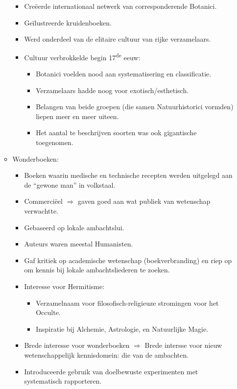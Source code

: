 \documentclass{article}
\begin{document}
\begin{itemize}
\begin{itemize}
\begin{itemize}
        \item Cre\"eerde internationaal netwerk van corresponderende Botanici.
        \item Ge\"ilustreerde kruidenboeken.
        \item Werd onderdeel van de elitaire cultuur van rijke verzamelaars.
        \item Cultuur verbrokkelde begin 17\textsuperscript{de} eeuw:
        \begin{itemize}
          \item Botanici voelden nood aan systematisering en classificatie.
          \item Verzamelaars hadde noog voor exotisch/esthetisch.
          \item Belangen van beide groepen (die samen Natuurhistorici vormden) liepen meer en meer uiteen.
          \item Het aantal te beschrijven soorten was ook gigantische toegenomen.
        \end{itemize}
      \end{itemize}
      \item Wonderboeken:
      \begin{itemize}
        \item Boeken waarin medische en technische recepten werden uitgelegd aan de ``gewone man'' in volkstaal.
        \item Commerci\"eel $\Rightarrow$ gaven goed aan wat publiek van wetenschap verwachtte.
        \item Gebaseerd op lokale ambachtslui.
        \item Auteurs waren meestal Humanisten.
        \item Gaf kritiek op academische wetenschap (boekverbranding) en riep op om kennis bij lokale ambachtsliederen te zoeken.
        \item Interesse voor Hermitisme:
        \begin{itemize}
          \item Verzamelnaam voor filosofisch-religieuze stromingen voor het Occulte.
          \item Inspiratie bij Alchemie, Astrologie, en Natuurlijke Magie.
        \end{itemize}
        \item Brede interesse voor wonderboeken $\Rightarrow$ Brede intersse voor nieuw wetenschappelijk kennisdomein: die van de ambachten.
        \item Introduceerde gebruik van doelbewuste experimenten met systematisch rapporteren.

\end{itemize}
\end{itemize}
\end{itemize}
\end{document}
